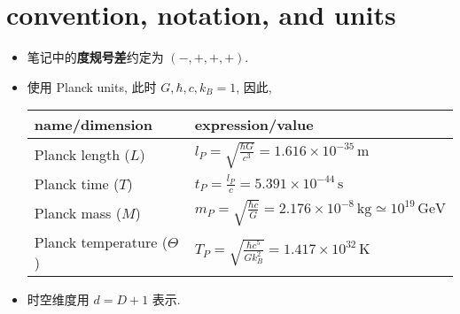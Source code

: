 \chapter*{convention, notation, and units}
\begin{itemize}
	\item 笔记中的\textbf{度规号差}约定为 $\boldsymbol{(-, +, +, +)}$.
	
	\item 使用 Planck units, 此时 $G, \hbar, c, k_B = 1$, 因此,
	
	\begin{center}
		\begin{tabularx}{\linewidth}{KK}
			\toprule 
			name/dimension & expression/value \\
			\midrule 
			Planck length ($L$) & $l_P = \sqrt{\frac{\hbar G}{c^3}} = 1.616 \times 10^{- 35} \, \text{m}$ \\
			Planck time ($T$) & $t_P = \frac{l_P}{c} = 5.391 \times 10^{- 44} \, \text{s}$ \\
			Planck mass ($M$) & $m_P = \sqrt{\frac{\hbar c}{G}} = 2.176 \times 10^{- 8} \, \text{kg} \simeq 10^{19} \, \text{GeV}$ \\
			Planck temperature ($\Theta$) & $T_P = \sqrt{\frac{\hbar c^5}{G k_B^2}} = 1.417 \times 10^{32} \, \text{K}$ \\
			\bottomrule
		\end{tabularx}
	\end{center}
	
	\item 时空维度用 $d = D + 1$ 表示.
\end{itemize}
